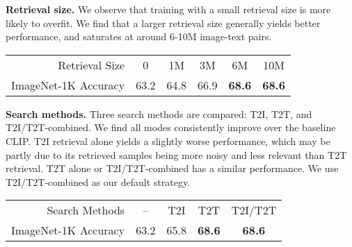 \documentclass[10pt,twocolumn,letterpaper]{article}
\renewcommand{\paragraph}[1]{\vspace{1.25mm}\noindent\textbf{#1}}
\begin{document}
\paragraph{Retrieval size.}   We observe that training with a small retrieval size is more likely to overfit. We find that a larger retrieval size generally yields better performance, and saturates at around 6-10M image-text pairs. 
\begin{table}[h!]
    \centering
    \footnotesize
    \begin{tabular}{r|ccccc}
        Retrieval Size & 0 & 1M & 3M & 6M & 10M \\
        \shline
        ImageNet-1K Accuracy & 63.2 & 64.8 & 66.9 & \textbf{68.6} & \textbf{68.6} \\
    \end{tabular}
    \vspace{-3mm}
\end{table}

\paragraph{Search methods.}  Three search methods are compared: T2I, T2T, and T2I/T2T-combined.  We find all modes consistently improve over the baseline CLIP.  T2I retrieval alone yields a slightly worse performance, which may be partly due to its retrieved samples being more noisy and less relevant than T2T retrieval.  T2T alone or T2I/T2T-combined has a similar performance.  We use T2I/T2T-combined as our default strategy.

\begin{table}[h]
    \centering
    \footnotesize
    \begin{tabular}{r|cccc}
        Search Methods & -- & T2I & T2T & T2I/T2T \\
        \shline
        ImageNet-1K Accuracy & 63.2 & 65.8 & \textbf{68.6} & \textbf{68.6} \\
    \end{tabular}
    \vspace{-3mm}
\end{table}
\end{document}
